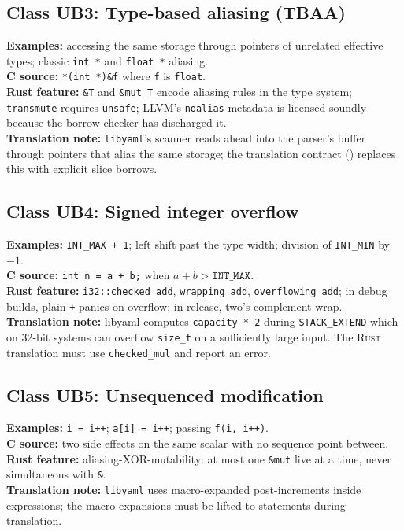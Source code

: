 \documentclass[12pt]{article}
\newcommand{\rust}{\textnormal{\textsc{Rust}}}
\newcommand{\libyaml}{\texttt{libyaml}}
\theoremstyle{definition}
\theoremstyle{remark}
\begin{document}
\subsection{Class UB3: Type-based aliasing (TBAA)}
\textbf{Examples:} accessing the same storage through pointers of unrelated effective types; classic \texttt{int *} and \texttt{float *} aliasing.\\
\textbf{C source:} \texttt{*(int *)\&f} where \texttt{f} is \texttt{float}.\\
\textbf{Rust feature:} \texttt{\&T} and \texttt{\&mut T} encode aliasing rules in the type system; \texttt{transmute} requires \texttt{unsafe}; LLVM's \texttt{noalias} metadata is licensed soundly because the borrow checker has discharged it.\\
\textbf{Translation note:} \libyaml{}'s scanner reads ahead into the parser's buffer through pointers that alias the same storage; the translation contract () replaces this with explicit slice borrows.

\subsection{Class UB4: Signed integer overflow}
\textbf{Examples:} \texttt{INT\_MAX + 1}; left shift past the type width; division of \texttt{INT\_MIN} by \(-1\).\\
\textbf{C source:} \texttt{int n = a + b;} when \(a + b > \mathtt{INT\_MAX}\).\\
\textbf{Rust feature:} \texttt{i32::checked\_add}, \texttt{wrapping\_add}, \texttt{overflowing\_add}; in debug builds, plain \texttt{+} panics on overflow; in release, two's-complement wrap.\\
\textbf{Translation note:} libyaml computes \texttt{capacity * 2} during \texttt{STACK\_EXTEND} which on 32-bit systems can overflow \texttt{size\_t} on a sufficiently large input. The \rust{} translation must use \texttt{checked\_mul} and report an error.

\subsection{Class UB5: Unsequenced modification}
\textbf{Examples:} \texttt{i = i++}; \texttt{a[i] = i++}; passing \texttt{f(i, i++)}.\\
\textbf{C source:} two side effects on the same scalar with no sequence point between.\\
\textbf{Rust feature:} aliasing-XOR-mutability: at most one \texttt{\&mut} live at a time, never simultaneous with \texttt{\&}.\\
\textbf{Translation note:} \libyaml{} uses macro-expanded post-increments inside expressions; the macro expansions must be lifted to statements during translation.
\end{document}
